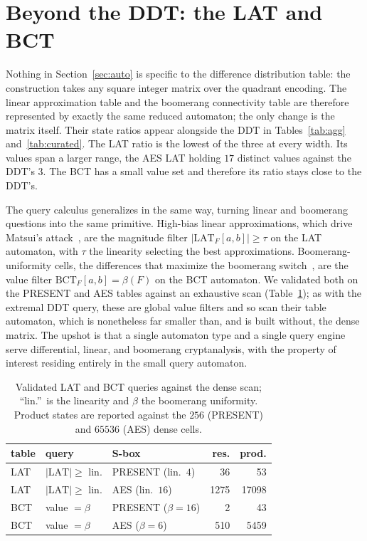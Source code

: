 \documentclass[runningheads]{llncs}
\newcommand{\LAT}{\mathrm{LAT}}
\newcommand{\BCT}{\mathrm{BCT}}
\begin{document}
\section{Beyond the DDT: the LAT and BCT}
\label{sec:beyond}

Nothing in Section~\ref{sec:auto} is specific to the difference distribution
table: the construction takes any square integer matrix over the quadrant
encoding. The linear approximation table and the boomerang connectivity table are
therefore represented by exactly the same reduced automaton; the only change is
the matrix itself. Their state ratios appear alongside the DDT in
Tables~\ref{tab:agg} and~\ref{tab:curated}. The LAT ratio is the lowest of the three at every width. Its values span a larger range, the AES LAT holding $17$ distinct values against the DDT's $3$. The BCT has a small value set and therefore its ratio stays close to the DDT's.

The query calculus generalizes in the same way, turning linear and boomerang
questions into the same primitive. High-bias linear approximations, which drive
Matsui's attack~\cite{Matsui1994}, are the magnitude filter $|\LAT_F[a,b]|\ge\tau$
on the LAT automaton, with $\tau$ the linearity selecting the best approximations.
Boomerang-uniformity cells, the differences that maximize the boomerang
switch~\cite{Wagner1999,CidEtAl2018}, are the value filter $\BCT_F[a,b]=\beta(F)$ on the BCT
automaton. We validated both on the PRESENT and AES tables against an exhaustive
scan (Table~\ref{tab:latbct}); as with the extremal DDT query, these are global
value filters and so scan their table automaton, which is nonetheless far smaller
than, and is built without, the dense matrix. The upshot is that a single
automaton type and a single query engine serve differential, linear, and boomerang
cryptanalysis, with the property of interest residing entirely in the small query
automaton.

\begin{table}
\centering
\caption{Validated LAT and BCT queries against the dense scan; ``lin.''\ is the
linearity and $\beta$ the boomerang uniformity. Product states are reported
against the $256$ (PRESENT) and $65536$ (AES) dense cells.}
\setlength{\tabcolsep}{3pt}
\label{tab:latbct}
\begin{tabular}{l l l r r}
\toprule
table & query & S-box & res. & prod.\\
\midrule
LAT & $|\LAT|\ge$ lin. & PRESENT (lin.\ $4$) & 36   & 53\\
LAT & $|\LAT|\ge$ lin. & AES (lin.\ $16$)    & 1275 & 17098\\
BCT & value $=\beta$ & PRESENT ($\beta{=}16$) & 2    & 43\\
BCT & value $=\beta$ & AES ($\beta{=}6$)      & 510  & 5459\\
\bottomrule
\end{tabular}
\end{table}
\end{document}
